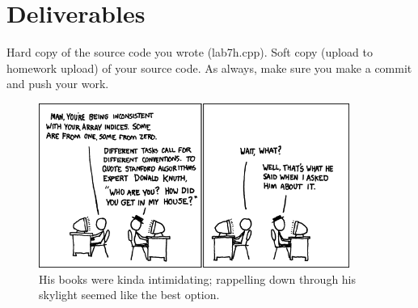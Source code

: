 \documentclass[letterpaper,12pt]{article}
\begin{document}
\section*{Deliverables}
Hard copy of the source code you wrote (lab7h.cpp). Soft copy (upload to homework upload) of
your source code. As always, make sure you make a commit and push your work.

\begin{figure}[ht!]
	\centering
	\includegraphics[width=4in]{donald_knuth.png}
    \caption*{His books were kinda intimidating; rappelling down through his skylight seemed like the best option.}
\end{figure}
\end{document}
